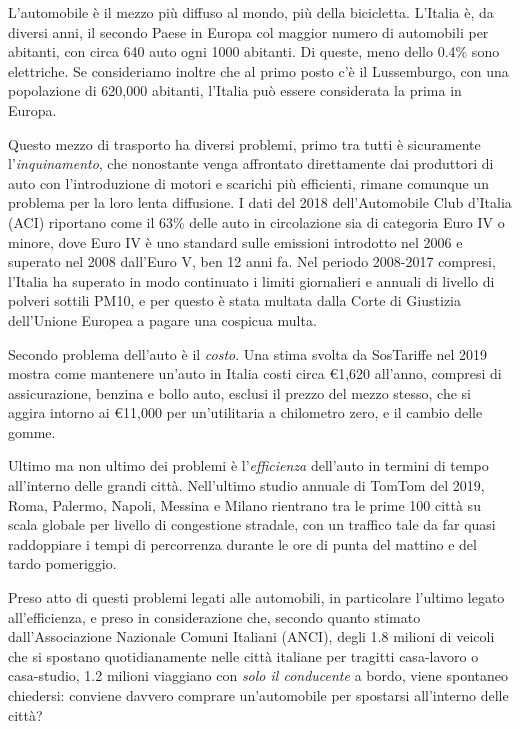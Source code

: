 L'automobile è il mezzo più diffuso al mondo, più della bicicletta. L'Italia è, da diversi anni, il secondo Paese in Europa col maggior numero di automobili per abitanti, con circa 640 auto ogni 1000 abitanti. Di queste, meno dello 0.4\% sono elettriche. Se consideriamo inoltre che al primo posto c'è il Lussemburgo, con una popolazione di 620,000 abitanti, l'Italia può essere considerata la prima in Europa.

Questo mezzo di trasporto ha diversi problemi, primo tra tutti è sicuramente l'\emph{inquinamento}, che nonostante venga affrontato direttamente dai produttori di auto con l'introduzione di motori e scarichi più efficienti, rimane comunque un problema per la loro lenta diffusione. I dati del 2018 dell'Automobile Club d'Italia (ACI) riportano come il 63\% delle auto in circolazione sia di categoria Euro IV o minore, dove Euro IV è uno standard sulle emissioni introdotto nel 2006 e superato nel 2008 dall'Euro V, ben 12 anni fa. Nel periodo 2008-2017 compresi, l'Italia ha superato in modo continuato i limiti giornalieri e annuali di livello di polveri sottili PM10, e per questo è stata multata dalla Corte di Giustizia dell'Unione Europea a pagare una cospicua multa.

Secondo problema dell'auto è il \emph{costo}. Una stima svolta da SosTariffe nel 2019 mostra come mantenere un'auto in Italia costi circa €1,620 all'anno, compresi di assicurazione, benzina e bollo auto, esclusi il prezzo del mezzo stesso, che si aggira intorno ai €11,000 per un'utilitaria a chilometro zero, e il cambio delle gomme.

Ultimo ma non ultimo dei problemi è l'\emph{efficienza} dell'auto in termini di tempo all'interno delle grandi città. Nell'ultimo studio annuale di TomTom del 2019\cite{tomtomindexmilan}, Roma, Palermo, Napoli, Messina e Milano rientrano tra le prime 100 città su scala globale per livello di congestione stradale, con un traffico tale da far quasi raddoppiare i tempi di percorrenza durante le ore di punta del mattino e del tardo pomeriggio.

Preso atto di questi problemi legati alle automobili, in particolare l'ultimo legato all'efficienza, e preso in considerazione che, secondo quanto stimato dall'Associazione Nazionale Comuni Italiani (ANCI), degli 1.8 milioni di veicoli che si spostano quotidianamente nelle città italiane per tragitti casa-lavoro o casa-studio, 1.2 milioni viaggiano con \emph{solo il conducente} a bordo, viene spontaneo chiedersi: conviene davvero comprare un'automobile per spostarsi all'interno delle città?
